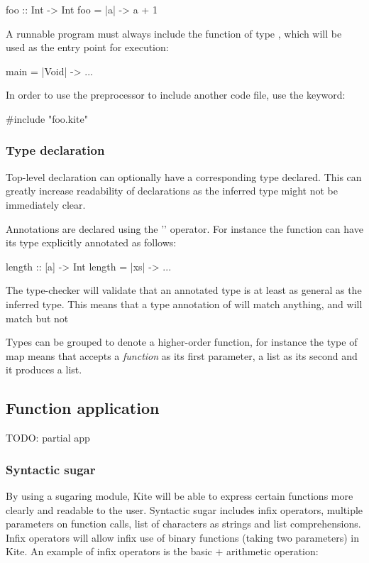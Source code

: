 \begin{kite}
foo :: Int -> Int
foo = |a| -> {
  a + 1
}
\end{kite}

A runnable program must always include the  function of type , which will be used as the entry point for execution:

\begin{kite}
main = |Void| -> { ... }
\end{kite}

In order to use the preprocessor to include another code file, use the  keyword:
\begin{kite}
#include "foo.kite"
\end{kite}

\subsubsection{Type declaration}

Top-level declaration can optionally have a corresponding type declared. This can greatly increase readability of declarations as the inferred type might not be immediately clear.

Annotations are declared using the '\code{::}' operator. For instance the function  can have its type explicitly annotated as follows:

\begin{kite}
length :: [a] -> Int
length = |xs| -> {
  ...
}
\end{kite}

The type-checker will validate that an annotated type is at least as general as the inferred type. This means that a type annotation of  will match anything, and  will match  but not 

Types can be grouped to denote a higher-order function, for instance the type of map  means that  accepts a \emph{function} as its first parameter, a list as its second and it produces a list.


\subsection{Function application}
TODO: partial app


\subsubsection{Syntactic sugar}
\label{sec:kite-design-sugar}
By using a sugaring module, Kite will be able to express certain functions more clearly and readable to the user. Syntactic sugar includes infix operators, multiple parameters on function calls, list of characters as strings and list comprehensions. Infix operators will allow infix use of binary functions (taking two parameters) in Kite. An example of infix operators is the basic $+$ arithmetic operation:

